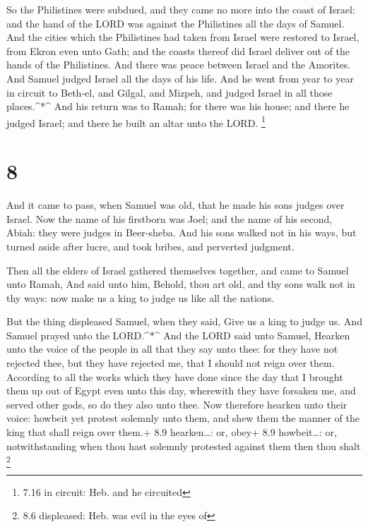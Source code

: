  So the Philistines were subdued, and they came no more
into the coast of Israel: and the hand of the LORD was against the
Philistines all the days of Samuel.  And the cities which
the Philistines had taken from Israel were restored to Israel, from
Ekron even unto Gath; and the coasts thereof did Israel deliver out of
the hands of the Philistines. And there was peace between Israel and the
Amorites.  And Samuel judged Israel all the days of his
life.  And he went from year to year in circuit to Beth-el,
and Gilgal, and Mizpeh, and judged Israel in all those places.\^{}*\^{}
 And his return was to Ramah; for there was his house; and
there he judged Israel; and there he built an altar unto the LORD.
\footnote{7.16 in circuit: Heb. and he circuited}

\hypertarget{section-7}{%
\section{8}\label{section-7}}

 And it came to pass, when Samuel was old, that he made his
sons judges over Israel.  Now the name of his firstborn was
Joel; and the name of his second, Abiah: they were judges in Beer-sheba.
 And his sons walked not in his ways, but turned aside after
lucre, and took bribes, and perverted judgment.

 Then all the elders of Israel gathered themselves together,
and came to Samuel unto Ramah,  And said unto him, Behold,
thou art old, and thy sons walk not in thy ways: now make us a king to
judge us like all the nations.

 But the thing displeased Samuel, when they said, Give us a
king to judge us. And Samuel prayed unto the LORD.\^{}*\^{} 
And the LORD said unto Samuel, Hearken unto the voice of the people in
all that they say unto thee: for they have not rejected thee, but they
have rejected me, that I should not reign over them. 
According to all the works which they have done since the day that I
brought them up out of Egypt even unto this day, wherewith they have
forsaken me, and served other gods, so do they also unto thee.
 Now therefore hearken unto their voice: howbeit yet protest
solemnly unto them, and shew them the manner of the king that shall
reign over them.+ 8.9 hearken\ldots: or, obey+ 8.9 howbeit\ldots: or,
notwithstanding when thou hast solemnly protested against them then thou
shalt \footnote{8.6 displeased: Heb. was evil in the eyes of}

